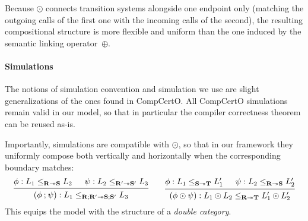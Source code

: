 \documentclass[acmsmall,screen,review,anonymous]{acmart}
\begin{document}
Because $\odot$ connects transition systems
alongside one endpoint only
(matching the outgoing calls of the first one with
the incoming calls of the second),
the resulting compositional structure
is more flexible and uniform
than the one induced by
the semantic linking operator~$\oplus$.


\paragraph{Simulations} \label{sec:overview:sim} %

The notions of simulation convention and simulation we use 
are slight generalizations of the ones found in CompCertO.
All CompCertO simulations remain valid in our model,
so that in particular the compiler correctness theorem
can be reused as-is.

Importantly,
simulations are compatible with $\odot$,
so that in our framework
they uniformly compose both
vertically and horizontally
when the corresponding boundary matches:
\begin{equation} \label{eqn:hvcomp}
  \begin{prooftree}
    \hypo{\phi : L_1 \le_{\mathbf{R} \twoheadrightarrow \mathbf{S}} L_2}
    \hypo{\psi : L_2 \le_{\mathbf{R'} \twoheadrightarrow \mathbf{S'}} L_3}
    \infer2{(\phi \mathbin; \psi) :
      L_1 \le_{\mathbf{R} \mathbin; \mathbf{R'} \twoheadrightarrow
      \mathbf{S} \mathbin; \mathbf{S'}} L_3}
  \end{prooftree}
  \qquad
  \begin{prooftree}
    \hypo{\phi : L_1 \le_{\mathbf{S} \twoheadrightarrow \mathbf{T}} L_1'}
    \hypo{\psi : L_2 \le_{\mathbf{R} \twoheadrightarrow \mathbf{S}} L_2'}
    \infer2{(\phi \odot \psi) : L_1 \odot L_2
      \le_{\mathbf{R} \twoheadrightarrow \mathbf{T}}
      L_1' \odot L_2'}
  \end{prooftree}
\end{equation}
This equips the model
with the structure of a \emph{double category}.
\end{document}
